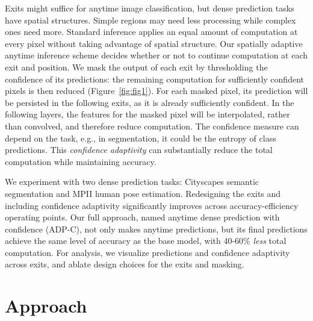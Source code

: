 Exits might suffice for anytime image classification, but dense prediction tasks have spatial structures.
Simple regions may need less processing while complex ones need more.
Standard inference applies an equal amount of computation at every pixel without taking advantage of spatial structure.
Our spatially adaptive anytime inference scheme decides whether or not to continue computation at each exit and position.
We mask the output of each exit by thresholding the confidence of its predictions: the remaining computation for sufficiently confident pixels is then reduced (Figure~\ref{fig:fig1}).
For each masked pixel, its prediction will be persisted in the following exits, as it is already sufficiently confident.
In the following layers, the features for the masked pixel will be interpolated, rather than convolved, and therefore reduce computation.
The confidence measure can depend on the task, e.g., in segmentation, it could be the entropy of class predictions.
This \emph{confidence adaptivity} can substantially reduce the total computation while maintaining accuracy. 


We experiment with two dense prediction tasks: Cityscapes semantic segmentation and MPII human pose estimation. 
Redesigning the exits and including confidence adaptivity significantly improves across accuracy-efficiency operating points.
Our full approach, named anytime dense prediction with confidence (ADP-C), not only makes anytime predictions, but its final predictions achieve the same level of accuracy as the base model, with 40-60\% \emph{less} total computation.
For analysis, we visualize predictions and confidence adaptivity across exits, and ablate design choices for the exits and masking.


\section{Approach}
\label{sec:approach}

